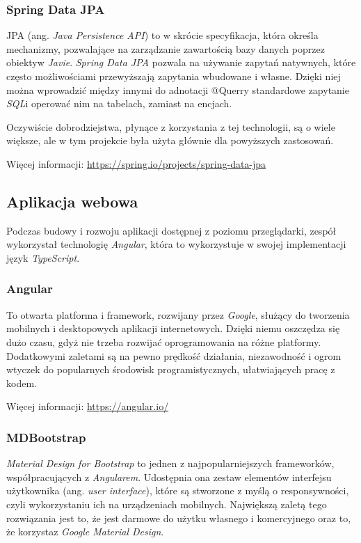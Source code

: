 \documentclass[twoside]{projektInzynierskiMS}
\numberwithin{figure}{section}
\begin{document}
\subsubsection{Spring Data JPA}
JPA (ang. \textit{Java Persistence API}) to w skrócie specyfikacja, która określa mechanizmy, pozwalające na zarządzanie zawartością bazy danych poprzez obiekty\linebreak w \textit{Javie}. \textit{Spring Data JPA} pozwala na używanie zapytań natywnych, które często możliwościami przewyższają zapytania wbudowane i własne. Dzięki niej można wprowadzić między innymi do adnotacji @Querry standardowe zapytanie \textit{SQL}\linebreak i operować nim na tabelach, zamiast na encjach. 

Oczywiście dobrodziejstwa, płynące z korzystania z tej technologii, są o wiele większe, ale w tym projekcie była użyta głównie dla powyższych zastosowań.

Więcej informacji: \url{https://spring.io/projects/spring-data-jpa}
\subsection{Aplikacja webowa}
Podczas budowy i rozwoju aplikacji dostępnej z poziomu przeglądarki, zespół wykorzystał technologię \textit{Angular}, która to wykorzystuje w swojej implementacji język \textit{TypeScript}.

\subsubsection{Angular}
To otwarta platforma i framework, rozwijany przez \textit{Google}, służący do tworzenia mobilnych i desktopowych aplikacji internetowych. Dzięki niemu oszczędza się dużo czasu, gdyż nie trzeba rozwijać oprogramowania na różne platformy. Dodatkowymi zaletami są na pewno prędkość działania, niezawodność i ogrom wtyczek do popularnych środowisk programistycznych, ułatwiających pracę z kodem. 

Więcej informacji: \url{https://angular.io/}
\subsubsection{MDBootstrap}
\textit{Material Design for Bootstrap} to jednen z najpopularniejszych frameworków, współpracujących z \textit{Angularem}. Udostępnia ona zestaw elementów interfejsu użytkownika (ang. \textit{user interface}), które są stworzone z myślą o responsywności, czyli wykorzystaniu ich na urządzeniach mobilnych. Największą zaletą tego rozwiązania jest to, że jest darmowe do użytku własnego i komercyjnego oraz to, że korzysta\linebreak z \textit{Google Material Design}.
\end{document}
